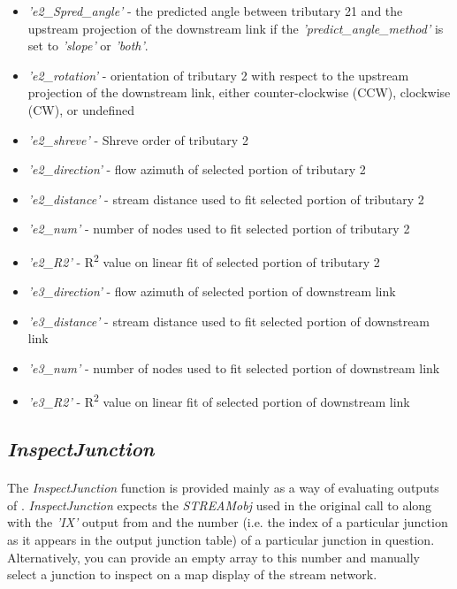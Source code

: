 \begin{itemize}
	\item \textit{'e2\_Spred\_angle'} - the predicted angle between tributary 21 and the upstream projection of the downstream link if the \textit{'predict\_angle\_method'} is set to \textit{'slope'} or \textit{'both'}.
	\item \textit{'e2\_rotation'} - orientation of tributary 2 with respect to the upstream projection of the downstream link, either counter-clockwise (CCW), clockwise (CW), or undefined
	\item \textit{'e2\_shreve'} - Shreve order of tributary 2
	\item \textit{'e2\_direction'} - flow azimuth of selected portion of tributary 2
	\item \textit{'e2\_distance'} - stream distance used to fit selected portion of tributary 2
	\item \textit{'e2\_num'} - number of nodes used to fit selected portion of tributary 2
	\item \textit{'e2\_R2'} - R\textsuperscript{2} value on linear fit of selected portion of tributary 2
	\item \textit{'e3\_direction'} - flow azimuth of selected portion of downstream link
	\item \textit{'e3\_distance'} - stream distance used to fit selected portion of downstream link
	\item \textit{'e3\_num'} - number of nodes used to fit selected portion of downstream link
	\item \textit{'e3\_R2'} - R\textsuperscript{2} value on linear fit of selected portion of downstream link
\end{itemize}

\subsection{\textit{InspectJunction}} \label{sec:InJunc}
\paragraph{}The \textit{InspectJunction} function is provided mainly as a way of evaluating outputs of . \textit{InspectJunction} expects the \textit{STREAMobj} used in the original call to  along with the \textit{'IX'} output from  and the number (i.e. the index of a particular junction as it appears in the output junction table) of a particular junction in question. Alternatively, you can provide an empty array to this number and manually select a junction to inspect on a map display of the stream network. 

